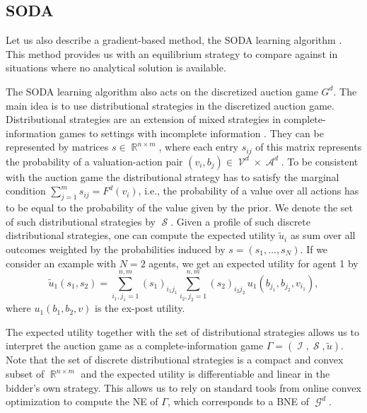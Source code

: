 \documentclass{article}
\DeclareMathOperator{\Acal}{\mathcal{A}}
\DeclareMathOperator{\Gcal}{\mathcal{G}}
\DeclareMathOperator{\Ical}{\mathcal{I}}
\DeclareMathOperator{\Scal}{\mathcal{S}}
\DeclareMathOperator{\Vcal}{\mathcal{V}}
\DeclareMathOperator{\R}{\mathbb{R}}
\begin{document}
\subsection{SODA} \label{sec:soda}
Let us also describe a gradient-based method, the SODA learning algorithm \citep{bichler2023soda}. 
This method provides us with an equilibrium strategy to compare against in situations where no analytical solution is available.

The SODA learning algorithm also acts on the discretized auction game $G^d$. The main idea is to use distributional strategies in the discretized auction game. Distributional strategies are an extension of mixed strategies in complete-information games to settings with incomplete information \citep{Milgrom1985}. 
They can be represented by matrices $s \in \R^{n \times m}$, where each entry $s_{ij}$ of this matrix represents the probability of a valuation-action pair $(v_i, b_j) \in \Vcal^d \times \Acal^d$. 
To be consistent with the auction game the distributional strategy has to satisfy the marginal condition  $\sum_{j=1}^m s_{ij} = F^d(v_i)$, i.e., the probability of a value over all actions has to be equal to the probability of the value given by the prior. We denote the set of such distributional strategies by $\Scal$.
Given a profile of such discrete distributional strategies, one can compute the expected utility $ \tilde u_i $ as sum over all outcomes weighted by the probabilities induced by $ s = (s_1,\dots, s_N) $.
If we consider an example with $N=2$ agents, we get an expected utility for agent 1 by
\begin{equation} \label{eq:exp_util_distr}
	\tilde u_1(s_1, s_2) = \sum_{i_1,j_1 = 1}^{n,m} (s_1)_{i_1j_1} \sum_{i_2,j_2 = 1}^{n,m} (s_2)_{i_2j_2} \, u_1(b_{j_1}, b_{j_2}, v_{i_1}),
\end{equation}
where $u_1(b_1, b_2, v)$ is the ex-post utility. 

The expected utility together with the set of distributional strategies allows us to interpret the auction game as a complete-information game $ \Gamma = (\Ical, \Scal, \tilde u) $. 
Note that the set of discrete distributional strategies is a compact and convex subset of $ \R^{n \times m} $ and the expected utility is differentiable and linear in the bidder's own strategy. This allows us to rely on standard tools from online convex optimization to compute the NE of $ \Gamma $, which corresponds to a BNE of $ \Gcal^d $.
\end{document}
